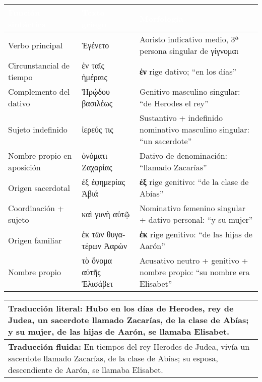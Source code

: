 \documentclass[a4paper,12pt]{article}
\begin{document}
\begin{tabularx}{\textwidth}{|Y|Y|Y|}
	\textcolor{white}{\textbf{Función sintáctica}} & \textcolor{white}{\textbf{Texto griego}} & \textcolor{white}{\textbf{Morfología}} \\
	\hline
	Verbo principal & \textgreek{Ἐγένετο} & Aoristo indicativo medio, 3ª persona singular de \textgreek{γίγνομαι} \\
	\hline
	Circunstancial de tiempo & \textgreek{ἐν ταῖς ἡμέραις} & \textbf{ἐν} rige dativo; “en los días” \\
	\hline
	Complemento del dativo & \textgreek{Ἡρῴδου βασιλέως} & Genitivo masculino singular: “de Herodes el rey” \\
	\hline
	Sujeto indefinido & \textgreek{ἱερεύς τις} & Sustantivo + indefinido nominativo masculino singular: “un sacerdote” \\
	\hline
	Nombre propio en aposición & \textgreek{ὀνόματι Ζαχαρίας} & Dativo de denominación: “llamado Zacarías” \\
	\hline
	Origen sacerdotal & \textgreek{ἐξ ἐφημερίας Ἀβιά} & \textbf{ἐξ} rige genitivo: “de la clase de Abías” \\
	\hline
	Coordinación + sujeto & \textgreek{καὶ γυνὴ αὐτῷ} & Nominativo femenino singular + dativo personal: “y su mujer” \\
	\hline
	Origen familiar & \textgreek{ἐκ τῶν θυγατέρων Ἀαρών} & \textbf{ἐκ} rige genitivo: “de las hijas de Aarón” \\
	\hline
	Nombre propio & \textgreek{τὸ ὄνομα αὐτῆς Ἐλισάβετ} & Acusativo neutro + genitivo + nombre propio: “su nombre era Elisabet” \\
	\hline
\end{tabularx}

\vspace{0.5cm}

\begin{tabularx}{\textwidth}{|Y|}
	\hline
	\textbf{Traducción literal:} Hubo en los días de Herodes, rey de Judea, un sacerdote llamado Zacarías, de la clase de Abías; y su mujer, de las hijas de Aarón, se llamaba Elisabet. \\
	\hline
	\textbf{Traducción fluida:} En tiempos del rey Herodes de Judea, vivía un sacerdote llamado Zacarías, de la clase de Abías; su esposa, descendiente de Aarón, se llamaba Elisabet. \\
	\hline
\end{tabularx}
\end{document}
